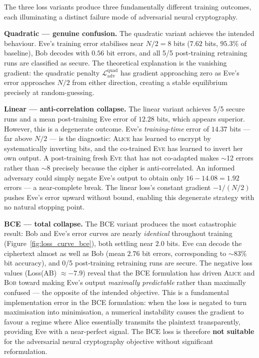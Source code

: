 \documentclass[12pt, a4paper]{article}
\newcommand{\alice}{\textsc{Alice}}
\newcommand{\bob}{\textsc{Bob}}
\newcommand{\eve}{\textsc{Eve}}
\begin{document}
The three loss variants produce three fundamentally different training
outcomes, each illuminating a distinct failure mode of adversarial
neural cryptography.

\textbf{Quadratic --- genuine confusion.}
The quadratic variant achieves the intended
behaviour. Eve's training error stabilises near $N/2 = 8$ bits
($7.62$ bits, $95.3\%$ of baseline), Bob decodes with $0.56$ bit errors, and
all 5/5 post-training retraining runs are classified as secure. The
theoretical explanation is the vanishing gradient: the quadratic
penalty $\mathcal{L}_{\mathrm{adv}}^{\mathrm{quad}}$ has gradient
approaching zero as Eve's error approaches $N/2$ from either direction,
creating a stable equilibrium precisely at random-guessing.

\textbf{Linear --- anti-correlation collapse.}
The linear variant achieves 5/5 secure runs and a mean post-training
Eve error of $12.28$ bits, which appears superior. However, this is a
degenerate outcome. Eve's \emph{training-time} error of $14.37$ bits
--- far above $N/2$ --- is the diagnostic: \alice{} has learned to
encrypt by systematically inverting bits, and the co-trained \eve{}
has learned to invert her own output. A post-training fresh \eve{}
that has not co-adapted makes $\sim$12 errors rather than $\sim$8
precisely because the cipher is anti-correlated. An informed adversary
could simply negate Eve's output to obtain only $16 - 14.08 = 1.92$
errors --- a near-complete break. The linear loss's constant gradient
$-1/(N/2)$ pushes Eve's error upward without bound, enabling this
degenerate strategy with no natural stopping point.

\textbf{BCE --- total collapse.}
The BCE variant produces the most catastrophic result: Bob and Eve's
error curves are nearly \emph{identical} throughout training
(Figure~\ref{fig:loss_curve_bce}), both settling near $2.0$ bits.
Eve can decode the ciphertext almost as well as Bob (mean $2.76$ bit
errors, corresponding to $\sim$83\% bit accuracy), and 0/5
post-training retraining runs are secure. The negative loss values
(Loss(AB) $\approx -7.9$) reveal that the BCE formulation has driven
\alice{} and \bob{} toward making Eve's output \emph{maximally
predictable} rather than maximally confused --- the opposite of the
intended objective. This is a fundamental implementation error in the
BCE formulation: when the loss is negated to turn maximisation into
minimisation, a numerical instability causes the gradient to favour
a regime where Alice essentially transmits the plaintext transparently,
providing Eve with a near-perfect signal. The BCE loss is therefore
\textbf{not suitable} for the adversarial neural cryptography
objective without significant reformulation.
\end{document}
